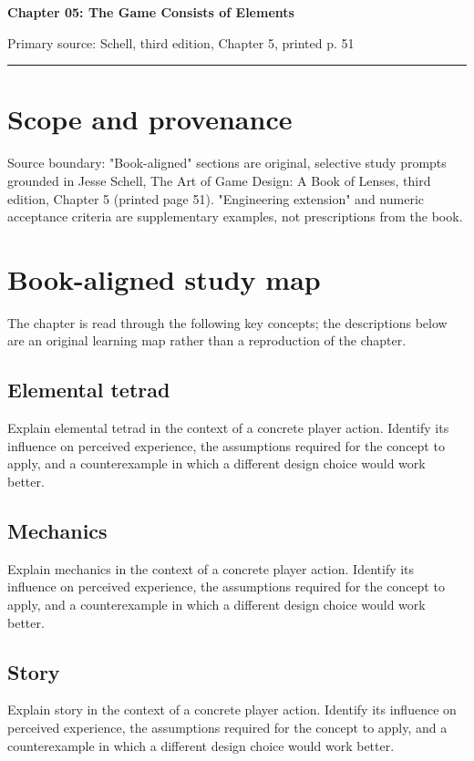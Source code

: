 \documentclass[11pt]{article}
\begin{document}
{\huge\bfseries\color{suiteblue} Chapter 05: The Game Consists of Elements}\par
\vspace{0.15in}
{\normalsize\color{suitegray} Primary source: Schell, third edition, Chapter 5, printed p. 51}\par
\vspace{0.15in}\hrule\vspace{0.15in}

\section{Scope and provenance}
Source boundary: "Book-aligned" sections are original, selective study prompts grounded in Jesse Schell, The Art of Game Design: A Book of Lenses, third edition, Chapter 5 (printed page 51). "Engineering extension" and numeric acceptance criteria are supplementary examples, not prescriptions from the book.


\section{Book-aligned study map}
The chapter is read through the following key concepts; the descriptions below are an original learning map rather than a reproduction of the chapter.


\subsection{Elemental tetrad}
Explain elemental tetrad in the context of a concrete player action. Identify its influence on perceived experience, the assumptions required for the concept to apply, and a counterexample in which a different design choice would work better.


\subsection{Mechanics}
Explain mechanics in the context of a concrete player action. Identify its influence on perceived experience, the assumptions required for the concept to apply, and a counterexample in which a different design choice would work better.


\subsection{Story}
Explain story in the context of a concrete player action. Identify its influence on perceived experience, the assumptions required for the concept to apply, and a counterexample in which a different design choice would work better.
\end{document}
